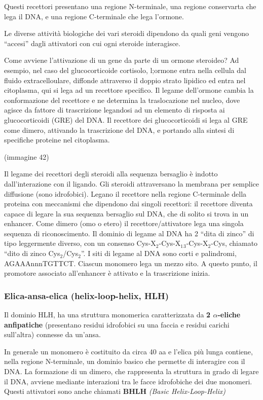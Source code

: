 \documentclass[]{article}
\begin{document}
Questi recettori presentano una regione N-terminale, una regione
conservarta che lega il DNA, e una regione C-terminale che lega
l'ormone.

Le diverse attività biologiche dei vari steroidi dipendono da quali geni
vengono ``accesi'' dagli attivatori con cui ogni steroide interagisce.

Come avviene l'attivazione di un gene da parte di un ormone steroideo?
Ad esempio, nel caso del glucocorticoide cortisolo, l;ormone entra nella
cellula dal fluido extracelloulare, diffonde attraverso il doppio strato
lipidico ed entra nel citoplasma, qui si lega ad un recettore specifico.
Il legame dell'ormone cambia la conformazione del recettore e ne
determina la traslocazione nel nucleo, dove agisce da fattore di
trascrizione legandosi ad un elemento di risposta ai glucocorticoidi
(GRE) del DNA. Il recettore dei glucocorticoidi si lega al GRE come
dimero, attivando la trascrizione del DNA, e portando alla sintesi di
specifiche proteine nel citoplasma.

(immagine 42)

Il legame dei recettori degli steroidi alla sequenza bersaglio è indotto
dall'interazione con il ligando. Gli steroidi attraversano la membrana
per semplice diffusione (sono idrofobici). Legano il recettore nella
regione C-terminale della proteina con meccanismi che dipendono dai
singoli recettori: il recettore diventa capace di legare la sua sequenza
bersaglio sul DNA, che di solito si trova in un enhancer. Come dimero
(omo o etero) il recettore/attivatore lega una singola sequenza di
riconoscimento. Il dominio di legame al DNA ha 2 ``dita di zinco'' di
tipo leggermente diverso, con un consenso
Cys-X\(_2\)-Cys-X\(_1\)\(_3\)-Cys-X\(_2\)-Cys, chiamato ``dito di zinco
Cys\(_2\)/Cys\(_2\)''. I siti di legame al DNA sono corti e palindromi,
AGAAAnnnTGTTCT. Ciascun monomero lega un mezzo sito. A questo punto, il
promotore associato all'enhancer è attivato e la trascrizione inizia.

\subsubsection{Elica-ansa-elica (helix-loop-helix,
HLH)}\label{elica-ansa-elica-helix-loop-helix-hlh}

Il dominio HLH, ha una struttura monomerica caratterizzata da \textbf{2
\(\alpha\)-eliche anfipatiche} (presentano residui idrofobici su una
faccia e residui carichi sull'altra) connesse da un'ansa.

In generale un monomero è costituito da circa 40 aa e l'elica più lunga
contiene, nella regione N-terminale, un dominio basico che permette di
interagire con il DNA. La formazione di un dimero, che rappresenta la
struttura in grado di legare il DNA, avviene mediante interazioni tra le
facce idrofobiche dei due monomeri. Questi attivatori sono anche
chiamati \textbf{BHLH} \emph{(Basic Helix-Loop-Helix)}
\end{document}
